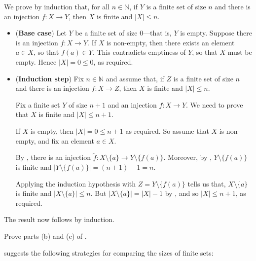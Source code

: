 \begin{cproof}[of (a)]
\item We prove by induction that, for all $n \in \mathbb{N}$, if $Y$ is a finite set of size $n$ and there is an injection $f : X \to Y$, then $X$ is finite and $|X| \le n$.

\begin{itemize}
\item (\textbf{Base case}) Let $Y$ be a finite set of size $0$---that is, $Y$ is empty. Suppose there is an injection $f : X \to Y$. If $X$ is non-empty, then there exists an element $a \in X$, so that $f(a) \in Y$. This contradicts emptiness of $Y$, so that $X$ must be empty. Hence $|X| = 0 \le 0$, as required.

\item (\textbf{Induction step}) Fix $n \in \mathbb{N}$ and assume that, if $Z$ is a finite set of size $n$ and there is an injection $f : X \to Z$, then $X$ is finite and $|X| \le n$.

Fix a finite set $Y$ of size $n+1$ and an injection $f : X \to Y$. We need to prove that $X$ is finite and $|X| \le n+1$.

If $X$ is empty, then $|X| = 0 \le n+1$ as required. So assume that $X$ is non-empty, and fix an element $a \in X$.

By , there is an injection $\tilde{f} : X \setminus \{ a \} \to Y \setminus \{ f(a) \}$. Moreover, by , $Y \setminus \{ f(a) \}$ is finite and $|Y \setminus \{ f(a) \}| = (n+1) - 1 = n$.

Applying the induction hypothesis with $Z = Y \setminus \{ f(a) \}$ tells us that, $X \setminus \{ a \}$ is finite and $|X \setminus \{ a \}| \le n$. But $|X \setminus \{ a \}| = |X| - 1$ by , and so $|X| \le n+1$, as required.
\end{itemize}

The result now follows by induction.
\end{cproof}

\begin{exercise}
Prove parts (b) and (c) of .
\end{exercise}

 suggests the following strategies for comparing the sizes of finite sets:

